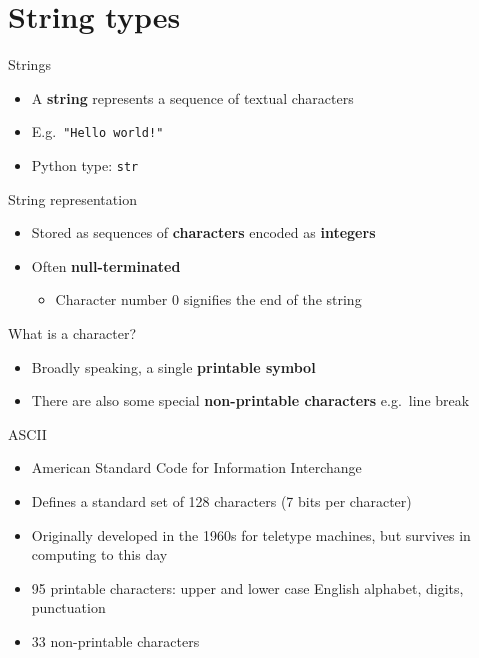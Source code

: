 \part{String types}
\frame{\partpage}

\begin{frame}{Strings}
	\begin{itemize}
		\pause\item A \textbf{string} represents a sequence of textual characters
		\pause\item E.g.\ \lstinline{"Hello world!"}
		\pause\item Python type: \lstinline{str}
	\end{itemize}
\end{frame}

\begin{frame}{String representation}
	\begin{itemize}
		\pause\item Stored as sequences of \textbf{characters} encoded as \textbf{integers}
		\pause\item Often \textbf{null-terminated}
			\begin{itemize}
				\pause\item Character number 0 signifies the end of the string
			\end{itemize}
	\end{itemize}
\end{frame}

\begin{frame}{What is a character?}
	\begin{itemize}
		\pause\item Broadly speaking, a single \textbf{printable symbol}
		\pause\item There are also some special \textbf{non-printable characters} e.g.\ line break
	\end{itemize}
\end{frame}

\begin{frame}{ASCII}
	\begin{itemize}
		\pause\item American Standard Code for Information Interchange
		\pause\item Defines a standard set of 128 characters (7 bits per character)
		\pause\item Originally developed in the 1960s for teletype machines, but survives in computing to this day
		\pause\item 95 printable characters: upper and lower case English alphabet, digits, punctuation
		\pause\item 33 non-printable characters
	\end{itemize}
\end{frame}

